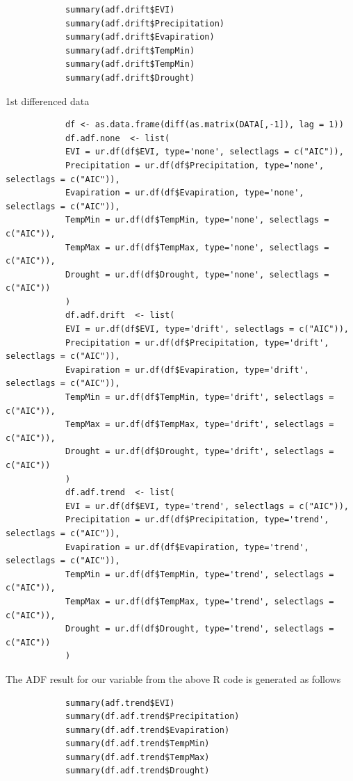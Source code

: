 \documentclass[12pt,a4paper]{book}
\begin{document}
			
				\begin{verbatim}
			summary(adf.drift$EVI)
			summary(adf.drift$Precipitation)
			summary(adf.drift$Evapiration)
			summary(adf.drift$TempMin)
			summary(adf.drift$TempMin)
			summary(adf.drift$Drought)
				\end{verbatim}
			1st differenced data
				\begin{verbatim}
			df <- as.data.frame(diff(as.matrix(DATA[,-1]), lag = 1))
			df.adf.none  <- list(
			EVI = ur.df(df$EVI, type='none', selectlags = c("AIC")),
			Precipitation = ur.df(df$Precipitation, type='none', selectlags = c("AIC")),
			Evapiration = ur.df(df$Evapiration, type='none', selectlags = c("AIC")),
			TempMin = ur.df(df$TempMin, type='none', selectlags = c("AIC")),
			TempMax = ur.df(df$TempMax, type='none', selectlags = c("AIC")),
			Drought = ur.df(df$Drought, type='none', selectlags = c("AIC"))
			)
			df.adf.drift  <- list(
			EVI = ur.df(df$EVI, type='drift', selectlags = c("AIC")),
			Precipitation = ur.df(df$Precipitation, type='drift', selectlags = c("AIC")),
			Evapiration = ur.df(df$Evapiration, type='drift', selectlags = c("AIC")),
			TempMin = ur.df(df$TempMin, type='drift', selectlags = c("AIC")),
			TempMax = ur.df(df$TempMax, type='drift', selectlags = c("AIC")),
			Drought = ur.df(df$Drought, type='drift', selectlags = c("AIC"))
			)
			df.adf.trend  <- list(
			EVI = ur.df(df$EVI, type='trend', selectlags = c("AIC")),
			Precipitation = ur.df(df$Precipitation, type='trend', selectlags = c("AIC")),
			Evapiration = ur.df(df$Evapiration, type='trend', selectlags = c("AIC")),
			TempMin = ur.df(df$TempMin, type='trend', selectlags = c("AIC")),
			TempMax = ur.df(df$TempMax, type='trend', selectlags = c("AIC")),
			Drought = ur.df(df$Drought, type='trend', selectlags = c("AIC"))
			)
				\end{verbatim}
	
			The ADF result for our variable from the above R code is generated as follows
			
				\begin{verbatim}
			summary(adf.trend$EVI)
			summary(df.adf.trend$Precipitation)
			summary(df.adf.trend$Evapiration)
			summary(df.adf.trend$TempMin)
			summary(df.adf.trend$TempMax)
			summary(df.adf.trend$Drought)
			
				\end{verbatim}
	
\end{document}
